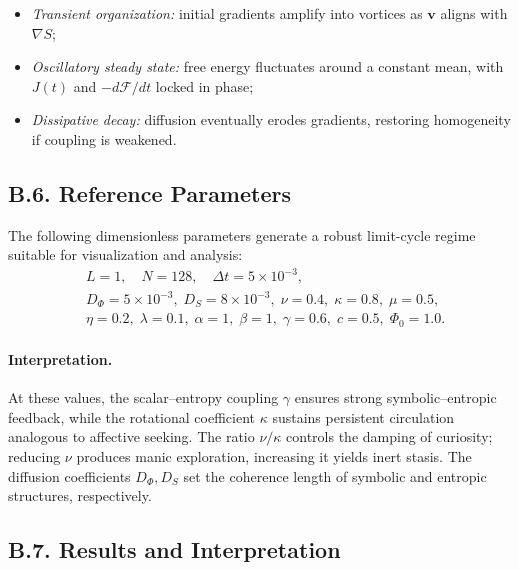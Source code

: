 \documentclass[12pt,a4paper]{article}
\begin{document}
\begin{itemize}[leftmargin=1.2em]
\item \emph{Transient organization:} initial gradients amplify into vortices as \(\mathbf{v}\) aligns with \(\nabla S\);
\item \emph{Oscillatory steady state:} free energy fluctuates around a constant mean, with \(J(t)\) and \(-d\mathcal{F}/dt\) locked in phase;
\item \emph{Dissipative decay:} diffusion eventually erodes gradients, restoring homogeneity if coupling is weakened.
\end{itemize}

\subsection*{B.6. Reference Parameters}

The following dimensionless parameters generate a robust limit-cycle regime suitable for visualization and analysis:
\[
\begin{aligned}
&L=1,\quad N=128,\quad \Delta t=5\times10^{-3}, \\[2pt]
&D_\Phi=5\times10^{-3},\; D_S=8\times10^{-3},\; \nu=0.4,\; \kappa=0.8,\; \mu=0.5,\\[2pt]
&\eta=0.2,\; \lambda=0.1,\; \alpha=1,\; \beta=1,\; \gamma=0.6,\; c=0.5,\; \Phi_0=1.0.
\end{aligned}
\]

\paragraph{Interpretation.}
At these values, the scalar–entropy coupling \(\gamma\) ensures strong symbolic–entropic feedback,
while the rotational coefficient \(\kappa\) sustains persistent circulation analogous to affective seeking.
The ratio \(\nu/\kappa\) controls the damping of curiosity; reducing \(\nu\) produces manic exploration,
increasing it yields inert stasis.
The diffusion coefficients \(D_\Phi,D_S\) set the coherence length of symbolic and entropic structures, respectively.

\subsection*{B.7. Results and Interpretation}
\end{document}

